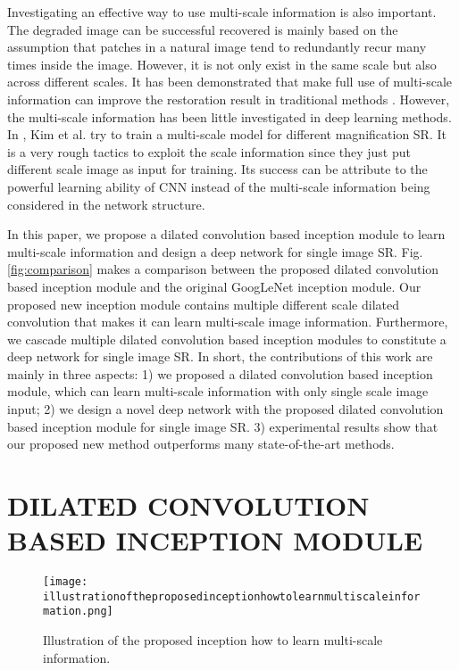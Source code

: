 \documentclass{article}
\begin{document}
Investigating an effective way to use multi-scale information is also important. The degraded image can be successful recovered is mainly based on the assumption that patches in a natural image tend to redundantly recur many times inside the image. However, it is not only exist in the same scale but also across different scales. It has been demonstrated that make full use of multi-scale information can improve the restoration result in traditional methods \cite{ref3}. However, the multi-scale information has been little investigated in deep learning methods. In \cite{ref9}, Kim et al. try to train a multi-scale model for different magnification SR. It is a very rough tactics to exploit the scale information since they just put different scale image as input for training. Its success can be attribute to the powerful learning ability of CNN instead of the multi-scale information being considered in the network structure.

In this paper, we propose a dilated convolution based inception module to learn multi-scale information and design a deep network for single image SR. Fig. \ref{fig:comparison} makes a comparison between the proposed dilated convolution based inception module and the original GoogLeNet inception module. Our proposed new inception module contains multiple different scale dilated convolution that makes it can learn multi-scale image information. Furthermore, we cascade multiple dilated convolution based inception modules to constitute a deep network for single image SR. In short, the contributions of this work are mainly in three aspects: 1) we proposed a dilated convolution based inception module, which can learn multi-scale information with only single scale image input; 2) we design a novel deep network with the proposed dilated convolution based inception module for single image SR. 3) experimental results show that our proposed new method outperforms many state-of-the-art methods.

\section{DILATED CONVOLUTION BASED INCEPTION MODULE}
\label{sec:dilated}

\begin{figure}[htb]

\begin{minipage}[b]{1.0\linewidth}
  \centering
  \centerline{\texttt{[image: illustrationoftheproposedinceptionhowtolearnmultiscaleinformation.png]}}
\end{minipage}
\vspace{-0.95cm}
\caption{Illustration of the proposed inception how to learn multi-scale information.}
\label{fig:illustration}
\vspace{-0.5cm}
\end{figure}
\end{document}
